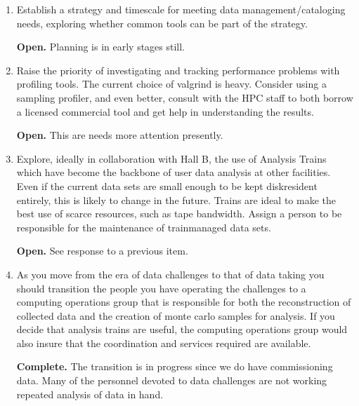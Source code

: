 \documentclass[12pt]{article}
\begin{document}
\begin{enumerate}
  {\bf Open.} A team has started work and is reporting progress
  regularly to the Offline Software Working Group.

\item Establish a strategy and timescale for meeting data
  management/cataloging needs, exploring whether common tools can be
  part of the strategy.

  {\bf Open.} Planning is in early stages still.

\item Raise the priority of investigating and tracking performance
  problems with profiling tools. The current choice of valgrind is
  heavy. Consider using a sampling profiler, and even better, consult
  with the HPC staff to both borrow a licensed commercial tool and get
  help in understanding the results.

  {\bf Open.} This are needs more attention presently.

\item Explore, ideally in collaboration with Hall B, the use of
  Analysis Trains which have become the backbone of user data analysis
  at other facilities. Even if the current data sets are small enough
  to be kept disk­resident entirely, this is likely to change in the
  future. Trains are ideal to make the best use of scarce resources,
  such as tape bandwidth. Assign a person to be responsible for the
  maintenance of train­managed data sets.

  {\bf Open.} See response to a previous item.

\item As you move from the era of data challenges to that of data
  taking you should transition the people you have operating the
  challenges to a computing operations group that is responsible for
  both the reconstruction of collected data and the creation of monte
  carlo samples for analysis. If you decide that analysis trains are
  useful, the computing operations group would also insure that the
  coordination and services required are available.

  {\bf Complete.} The transition is in progress since we do have
  commissioning data. Many of the personnel devoted to data challenges
  are not working repeated analysis of data in hand.

\end{enumerate}
\end{document}
